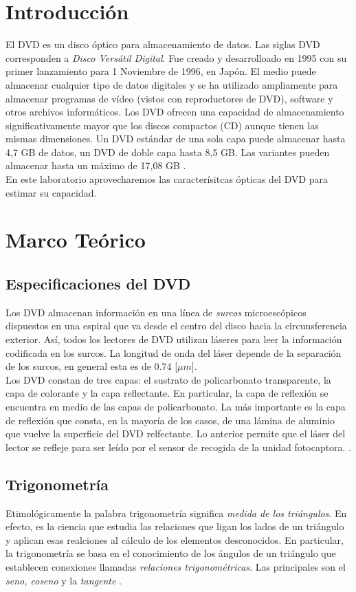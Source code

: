 \documentclass[10pt,a4paper]{article}
\begin{document}
	\begin{multicols}{2}
		\section{Introducción}
			El DVD es un disco óptico para almacenamiento de datos. Las siglas DVD corresponden a \emph{Disco Versátil Digital}. Fue creado y desarrolloado en 1995 con su primer lanzamiento para 1 Noviembre de 1996, en Japón. El medio puede almacenar cualquier tipo de datos digitales y se ha utilizado ampliamente para almacenar programas de vídeo (vistos con reproductores de DVD), software y otros archivos informáticos. Los DVD ofrecen una capacidad de almacenamiento significativamente mayor que los discos compactos (CD) aunque tienen las mismas dimensiones. Un DVD estándar de una sola capa puede almacenar hasta 4,7 GB de datos, un DVD de doble capa hasta 8,5 GB. Las variantes pueden almacenar hasta un máximo de 17,08 GB \cite{wikiDVD}.\\
			
			En este laboratorio aprovecharemos las caracterísitcas ópticas del DVD para estimar su capacidad.
		\section{Marco Teórico}
		\subsection{Especificaciones del DVD}
		Los DVD almacenan información en una línea de \emph{surcos} microescópicos dispuestos en una espiral que va desde el centro del disco hacia la circunsferencia exterior. Así, todos los lectores de DVD utilizan láseres para leer la información codificada en los surcos. La longitud de onda del láser depende de la separación de los surcos, en general esta es de 0.74 [$\mu m$].\\
		
		Los DVD constan de tres capas: el sustrato de policarbonato transparente, la capa de colorante y la capa reflectante. En partícular, la capa de reflexión se encuentra en medio de las capas de policarbonato. La más importante es la capa de reflexión que consta, en la mayoría de los casos, de una lámina de aluminio que vuelve la superficie del DVD relfectante. Lo anterior permite que el láser del lector se refleje para ser leído por el sensor de recogida de la unidad fotocaptora. \cite{especificaciones_DVD}.
		\subsection{Trigonometría}
		Etimológicamente la palabra trigonometría significa \textit{medida de los triángulos}. En efecto, es la ciencia que estudia las relaciones que ligan los lados de un triángulo y aplican esas realciones al cálculo de los elementos desconocidos. En particular, la trigonometría se basa en el conocimiento de los ángulos de un triángulo que establecen conexiones llamadas \textit{relaciones trigonométricas}. Las principales son el \emph{seno, coseno} y la \emph{tangente} \cite{trigonometria}.

\end{multicols}
\end{document}
